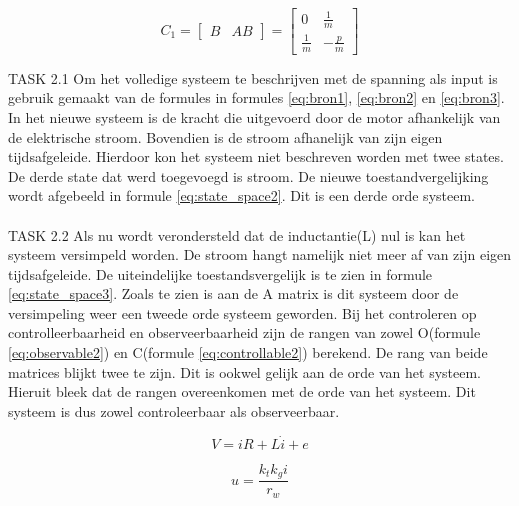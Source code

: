\documentclass[11pt,titlepage]{report}
\begin{document}
\begin{equation} \label{eq:controllable}
	C_{1} = \begin{bmatrix}
	  B & AB 
	\end{bmatrix} = \begin{bmatrix}
	0 & \frac{1}{m} \\
	\frac{1}{m} & -\frac{p}{m}
	\end{bmatrix}
\end{equation}


TASK 2.1
Om het volledige systeem te beschrijven met de spanning als input is gebruik gemaakt van de formules in formules \eqref{eq:bron1}, \eqref{eq:bron2} en \eqref{eq:bron3}. In het nieuwe systeem is de kracht die uitgevoerd door de motor afhankelijk van de elektrische stroom. Bovendien is de stroom afhanelijk van zijn eigen tijdsafgeleide. Hierdoor kon het systeem niet beschreven worden met twee states. De derde state dat werd toegevoegd is stroom. De nieuwe toestandvergelijking wordt afgebeeld in formule \eqref{eq:state_space2}. Dit is een derde orde systeem. \\ \\ 
TASK 2.2
Als nu wordt verondersteld dat de inductantie(L) nul is kan het systeem versimpeld worden. De stroom hangt namelijk niet meer af van zijn eigen tijdsafgeleide. De uiteindelijke toestandsvergelijk is te zien in formule \eqref{eq:state_space3}.
Zoals te zien is aan de A matrix is dit systeem door de versimpeling weer een tweede orde systeem geworden. Bij het controleren op controlleerbaarheid en observeerbaarheid zijn de rangen van zowel O(formule \eqref{eq:observable2}) en C(formule \eqref{eq:controllable2}) berekend. De rang van beide matrices blijkt twee te zijn. Dit is ookwel gelijk aan de orde van het systeem. Hieruit bleek dat de rangen overeenkomen met de orde van het systeem. Dit systeem is dus zowel controleerbaar als observeerbaar. 



\begin{equation} \label{eq:bron2}
V = iR + L\dot{i} + e
\end{equation}

\begin{equation} \label{eq:bron3}
u = \frac{k_{t}k_{g}i}{r_{w}}
\end{equation}
\end{document}

